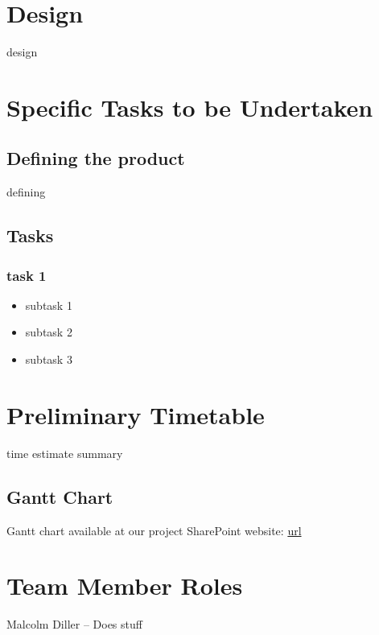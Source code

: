 \documentclass[12pt]{article}
\begin{document}
\section{Design}

design

\section{Specific Tasks to be Undertaken}

\subsection{Defining the product}

defining

\subsection{Tasks}

\subsubsection{task 1}
\begin{itemize}
    \item subtask 1
    \item subtask 2
    \item subtask 3
\end{itemize}

\section{Preliminary Timetable}

time estimate summary

\subsection{Gantt Chart}
Gantt chart available at our project SharePoint website: \url{url}
\begin{sidewaysfigure}
\end{sidewaysfigure}

\pagebreak

\section{Team Member Roles}

Malcolm Diller -- Does stuff
\end{document}
